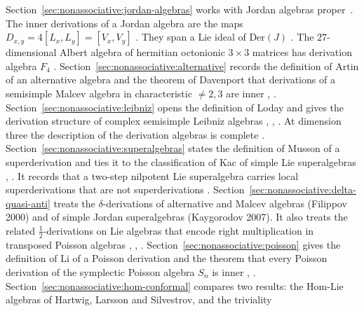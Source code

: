 Section~\ref{sec:nonassociative:jordan-algebras} works with Jordan
algebras proper~\cite[Theorem~5, p.~581]{Kaygorodov2014n1aryMaltsev}. The inner derivations of a Jordan algebra are the maps
$D_{x,y}=4[L_x,L_y]=[V_x,V_y]$ \cite[Problem~3.6, p.~185]{McCrimmon2004Taste}.
They span a Lie ideal of $\mathrm{Der}(J)$
\cite[Problem~3.6, p.~185]{McCrimmon2004Taste}. The $27$-dimensional
Albert algebra of hermitian octonionic $3\times 3$ matrices has derivation
algebra $F_4$ \cite[p.~52]{McCrimmon2004Taste}.
Section~\ref{sec:nonassociative:alternative} records the definition of Artin
of an alternative algebra and the theorem of Davenport that derivations of a
semisimple Malcev algebra in characteristic $\neq 2,3$ are inner
\cite[p.~148]{Baez2002Octonions}, \cite[p.~565]{Davenport1972Malcev}.
Section~\ref{sec:nonassociative:leibniz} opens the definition of Loday and
gives the derivation structure of complex semisimple Leibniz algebras
\cite[Definition~(1.1), p.~141]{LodayPirashvili1993},
\cite[Theorem~4.5]{AyupovKudaybergenovOmirovZhao2019},
\cite[Proposition~3.5, p.~2193]{BiyogmamTcheka2021Outer}. At dimension
three the description of the derivation algebras is complete
\cite[Theorem~1.1, p.~2]{KurdachenkoPypkaSemko2026}.
Section~\ref{sec:nonassociative:superalgebras} states the definition of Musson
of a superderivation and ties it to the classification of Kac of simple
Lie superalgebras \cite[Lemma~1.1.2, p.~2]{Musson2012},
\cite[p.~1375]{Kac1977Classification}. It records that a two-step nilpotent
Lie superalgebra carries local superderivations that are not
superderivations \cite[Theorems~3.2 and 3.5, pp.~7, 12]{ChiZhangMengTang2026}.
Section~\ref{sec:nonassociative:delta-quasi-anti} treats the
$\delta$-derivations of alternative and Malcev algebras (Filippov 2000)
and of simple Jordan superalgebras (Kaygorodov 2007). It also treats the
related $\tfrac{1}{2}$-derivations on Lie algebras that encode right
multiplication in transposed Poisson algebras
\cite[Theorems~2 and~3, pp.~356--358]{Filippov2000DeltaAlternative},
\cite[Theorems~2.5 and~4.4]{KacKaygorodov2007Delta},
\cite[Definition~5, p.~4]{FerreiraKaygorodovLopatkin21}.
Section~\ref{sec:nonassociative:poisson} gives the definition of Li of a
Poisson derivation and the theorem that every Poisson derivation of the
symplectic Poisson algebra $S_n$ is inner
\cite[Definitions, p.~658]{AlbertiArestiLi2018Poisson},
\cite[Theorem~2.1, pp.~658--659]{AlbertiArestiLi2018Poisson}.
Section~\ref{sec:nonassociative:hom-conformal} compares two results: the
Hom-Lie algebras of Hartwig, Larsson and Silvestrov, and the triviality
